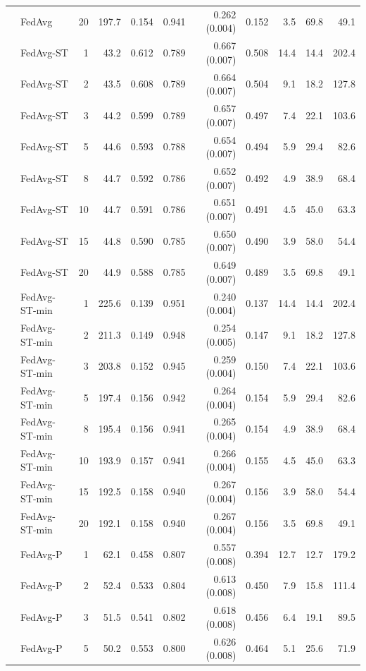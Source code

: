 \begin{longtable}{llrrrrrrrrr}
 & FedAvg & 20 & 197.7 & 0.154 & 0.941 & 0.262 (0.004) & 0.152 & 3.5 & 69.8 & 49.1 \\
 & FedAvg-ST & 1 & 43.2 & 0.612 & 0.789 & 0.667 (0.007) & 0.508 & 14.4 & 14.4 & 202.4 \\
 & FedAvg-ST & 2 & 43.5 & 0.608 & 0.789 & 0.664 (0.007) & 0.504 & 9.1 & 18.2 & 127.8 \\
 & FedAvg-ST & 3 & 44.2 & 0.599 & 0.789 & 0.657 (0.007) & 0.497 & 7.4 & 22.1 & 103.6 \\
 & FedAvg-ST & 5 & 44.6 & 0.593 & 0.788 & 0.654 (0.007) & 0.494 & 5.9 & 29.4 & 82.6 \\
 & FedAvg-ST & 8 & 44.7 & 0.592 & 0.786 & 0.652 (0.007) & 0.492 & 4.9 & 38.9 & 68.4 \\
 & FedAvg-ST & 10 & 44.7 & 0.591 & 0.786 & 0.651 (0.007) & 0.491 & 4.5 & 45.0 & 63.3 \\
 & FedAvg-ST & 15 & 44.8 & 0.590 & 0.785 & 0.650 (0.007) & 0.490 & 3.9 & 58.0 & 54.4 \\
 & FedAvg-ST & 20 & 44.9 & 0.588 & 0.785 & 0.649 (0.007) & 0.489 & 3.5 & 69.8 & 49.1 \\
 & FedAvg-ST-min & 1 & 225.6 & 0.139 & 0.951 & 0.240 (0.004) & 0.137 & 14.4 & 14.4 & 202.4 \\
 & FedAvg-ST-min & 2 & 211.3 & 0.149 & 0.948 & 0.254 (0.005) & 0.147 & 9.1 & 18.2 & 127.8 \\
 & FedAvg-ST-min & 3 & 203.8 & 0.152 & 0.945 & 0.259 (0.004) & 0.150 & 7.4 & 22.1 & 103.6 \\
 & FedAvg-ST-min & 5 & 197.4 & 0.156 & 0.942 & 0.264 (0.004) & 0.154 & 5.9 & 29.4 & 82.6 \\
 & FedAvg-ST-min & 8 & 195.4 & 0.156 & 0.941 & 0.265 (0.004) & 0.154 & 4.9 & 38.9 & 68.4 \\
 & FedAvg-ST-min & 10 & 193.9 & 0.157 & 0.941 & 0.266 (0.004) & 0.155 & 4.5 & 45.0 & 63.3 \\
 & FedAvg-ST-min & 15 & 192.5 & 0.158 & 0.940 & 0.267 (0.004) & 0.156 & 3.9 & 58.0 & 54.4 \\
 & FedAvg-ST-min & 20 & 192.1 & 0.158 & 0.940 & 0.267 (0.004) & 0.156 & 3.5 & 69.8 & 49.1 \\
 & FedAvg-P & 1 & 62.1 & 0.458 & 0.807 & 0.557 (0.008) & 0.394 & 12.7 & 12.7 & 179.2 \\
 & FedAvg-P & 2 & 52.4 & 0.533 & 0.804 & 0.613 (0.008) & 0.450 & 7.9 & 15.8 & 111.4 \\
 & FedAvg-P & 3 & 51.5 & 0.541 & 0.802 & 0.618 (0.008) & 0.456 & 6.4 & 19.1 & 89.5 \\
 & FedAvg-P & 5 & 50.2 & 0.553 & 0.800 & 0.626 (0.008) & 0.464 & 5.1 & 25.6 & 71.9 \\

\end{longtable}
